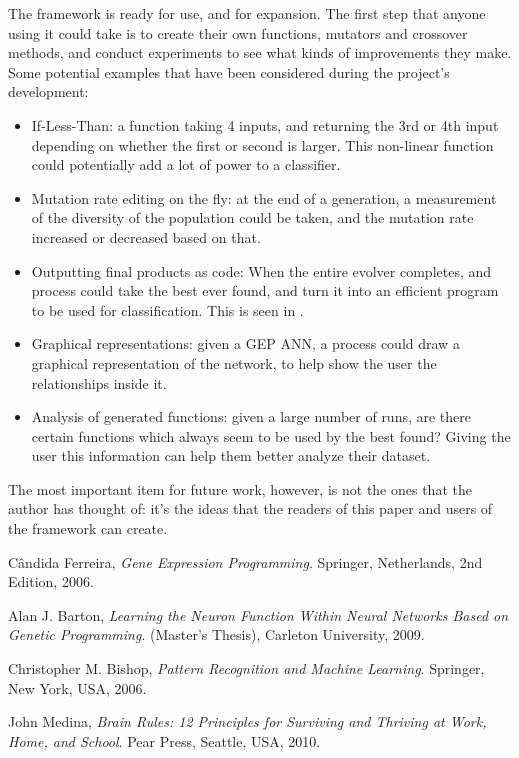 \documentclass[a4paper,11pt]{report}
\begin{document}
The framework is ready for use, and for expansion. The first step that anyone using it could take 
is to create their own functions, mutators and crossover methods, and conduct experiments to see 
what kinds of improvements they make. Some potential examples that have been considered during the 
project's development:
\begin{itemize}
 \item If-Less-Than: a function taking 4 inputs, and returning the 3rd or 4th input depending on whether 
the first or second is larger. This non-linear function could potentially add a lot of power to a classifier. 
 \item Mutation rate editing on the fly: at the end of a generation, a measurement of the diversity of 
the population could be taken, and the mutation rate increased or decreased based on that. 
 \item Outputting final products as code: When the entire evolver completes, and process could take the best
ever found, and turn it into an efficient program to be used for classification. This is seen in \cite{ferreira06}.
\item Graphical representations: given a GEP ANN, a process could draw a graphical representation of the 
network, to help show the user the relationships inside it. 
\item Analysis of generated functions: given a large number of runs, are there certain functions which 
always seem to be used by the best found? Giving the user this information can help them better analyze 
their dataset. 
\end{itemize}

The most important item for future work, however, is not the ones that the author has thought of: it's
the ideas that the readers of this paper and users of the framework can create. 



\begin{thebibliography}{9}

  C\^{a}ndida Ferreira,
  \emph{Gene Expression Programming}.
  Springer, Netherlands,
  2nd Edition,
  2006.

  Alan J. Barton, 
  \emph{Learning the Neuron Function Within Neural Networks Based on Genetic Programming}.
  (Master's Thesis),
  Carleton University, 2009.

  Christopher M. Bishop,
  \emph{Pattern Recognition and Machine Learning}.
  Springer, New York, USA,
  2006.

  John Medina, 
  \emph{Brain Rules: 12 Principles for Surviving and Thriving at Work, Home, and School}.
  Pear Press, Seattle, USA,
  2010.


\end{thebibliography}
\end{document}
